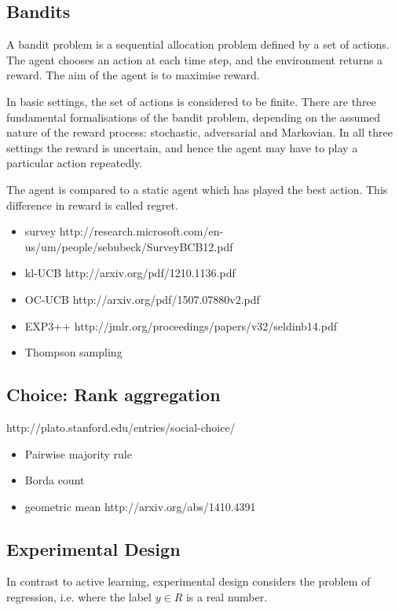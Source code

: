 \documentclass[fleqn,10pt,lineno]{wlpeerj} %
\begin{document}
\subsection*{Bandits}

A bandit problem is a sequential allocation problem defined by a set
of actions. The agent chooses an action at each time step, and the
environment returns a reward. The aim of the agent is to maximise reward.

In basic settings, the set of actions is considered to be
finite. There are three fundamental formalisations of the bandit
problem, depending on the assumed nature of the reward process:
stochastic, adversarial and Markovian. In all three settings the
reward is uncertain, and hence the agent may have to play a particular
action repeatedly.

The agent is compared to a static agent which has played the best
action. This difference in reward is called regret.

\begin{itemize}
  \item survey http://research.microsoft.com/en-us/um/people/sebubeck/SurveyBCB12.pdf
  \item kl-UCB http://arxiv.org/pdf/1210.1136.pdf
  \item OC-UCB http://arxiv.org/pdf/1507.07880v2.pdf
  \item EXP3++ http://jmlr.org/proceedings/papers/v32/seldinb14.pdf
  \item Thompson sampling
\end{itemize}

\subsection*{Choice: Rank aggregation}

http://plato.stanford.edu/entries/social-choice/

\begin{itemize}
  \item Pairwise majority rule
  \item Borda count
  \item geometric mean http://arxiv.org/abs/1410.4391
\end{itemize}


\subsection*{Experimental Design}

In contrast to active learning, experimental design considers the problem of regression, i.e. where the label $y\in R$ is a real number.
\end{document}
